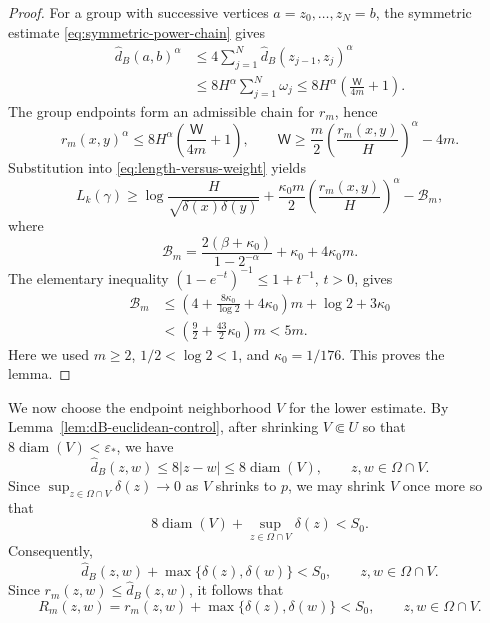 \documentclass[11pt]{article}
\theoremstyle{definition}
\newcommand{\eps}{\varepsilon}
\begin{document}
\begin{proof}
For a group with successive vertices \(a=z_0,\ldots,z_N=b\), the
symmetric estimate \eqref{eq:symmetric-power-chain} gives
\[
\begin{aligned}
\widehat d_B(a,b)^\alpha
&\le4\sum_{j=1}^N\widehat d_B(z_{j-1},z_j)^\alpha\\
&\le8H^\alpha\sum_{j=1}^N\omega_j
\le8H^\alpha\left(\frac{\mathsf W}{4m}+1\right).
\end{aligned}
\]
The group endpoints form an admissible chain for \(r_m\), hence
\[
r_m(x,y)^\alpha\le
8H^\alpha\left(\frac{\mathsf W}{4m}+1\right),
\qquad
\mathsf W\ge\frac m2\left(\frac{r_m(x,y)}H\right)^\alpha-4m.
\]
Substitution into \eqref{eq:length-versus-weight} yields
\[
L_k(\gamma)\ge
\log\frac{H}{\sqrt{\delta(x)\delta(y)}}
+\frac{\kappa_0m}{2}\left(\frac{r_m(x,y)}H\right)^\alpha
-\mathcal B_m,
\]
where
\[
\mathcal B_m
=\frac{2(\beta+\kappa_0)}{1-2^{-\alpha}}+\kappa_0+4\kappa_0m.
\]
The elementary inequality
\((1-e^{-t})^{-1}\le1+t^{-1}\), \(t>0\), gives
\[
\begin{aligned}
\mathcal B_m
&\le\left(4+\frac{8\kappa_0}{\log2}+4\kappa_0\right)m
+\log2+3\kappa_0\\
&<\left(\frac92+\frac{43}{2}\kappa_0\right)m
<5m.
\end{aligned}
\]
Here we used \(m\ge2\), \(1/2<\log2<1\), and \(\kappa_0=1/176\).
This proves the lemma.
\end{proof}

We now choose the endpoint neighborhood \(V\) for the lower estimate.
By Lemma~\ref{lem:dB-euclidean-control}, after shrinking
\(V\Subset U\) so that \(8\operatorname{diam}(V)<\eps_*\), we have
\[
\widehat d_B(z,w)\le8|z-w|\le8\operatorname{diam}(V),
\qquad z,w\in\Omega\cap V.
\]
Since \(\sup_{z\in\Omega\cap V}\delta(z)\to0\) as \(V\) shrinks to \(p\),
we may shrink \(V\) once more so that
\[
8\operatorname{diam}(V)+\sup_{z\in\Omega\cap V}\delta(z)<S_0.
\]
Consequently,
\begin{equation}\label{eq:local-smallness-final}
\widehat d_B(z,w)+\max\{\delta(z),\delta(w)\}<S_0,
\qquad z,w\in\Omega\cap V.
\end{equation}
Since \(r_m(z,w)\le\widehat d_B(z,w)\), it follows that
\begin{equation}\label{eq:R-local-smallness}
R_m(z,w)=r_m(z,w)+\max\{\delta(z),\delta(w)\}<S_0,
\qquad z,w\in\Omega\cap V.
\end{equation}
\end{document}
